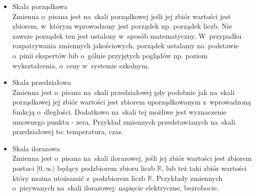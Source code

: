 \documentclass[12pt,a4paper]{report}
\begin{document}
\begin{itemize}


\item Skala porządkowa \cite[Rozdział 1.2]{panek2013}\\
Zmienna o~pisana jest na~skali porządkowej jeśli jej zbiór wartości jest zbiorem, w~którym wprowadzony jest porządek np. porządek liczb. Nie zawsze porządek ten jest ustalony w~sposób matematyczny. W~przypadku rozpatrywania zmiennych jakościowych, porządek ustalamy na~podstawie o~pinii ekspertów lub o~gólnie przyjętych poglądów np. poziom wykształcenia, o~ceny w~systemie szkolnym. 


\item Skala przedziałowa \cite[Rozdział 1.2]{panek2013}\\
Zmienna jest o~pisana na~skali przedziałowej gdy podobnie jak na~skali porządkowej jej zbiór wartości jest zbiorem uporządkowanym z~wprowadzoną funkcją o~dległości. Dodatkowo na~skali tej możliwe jest wyznaczenie umownego punktu - zera. Przykład zmiennych przedstawianych na~skali przedziałowej to: temperatura, czas.


\item Skala ilorazowa \cite[Rozdział 1.2]{panek2013}\\
Zmienna jest o~pisana na~skali ilorazowej, jeśli jej zbiór wartości jest zbiorem postaci $[0, \infty)$ będący podzbiorem zbioru liczb $\mathbb{R}$, lub też taki zbiór wartości który można utożsamić z~podzbiorem liczb $\mathbb{R}$. Przykłady zmiennych o~pisywanych na~skali ilorazowej: napięcie elektryczne, bezrobocie. 


\end{itemize}
\end{document}
